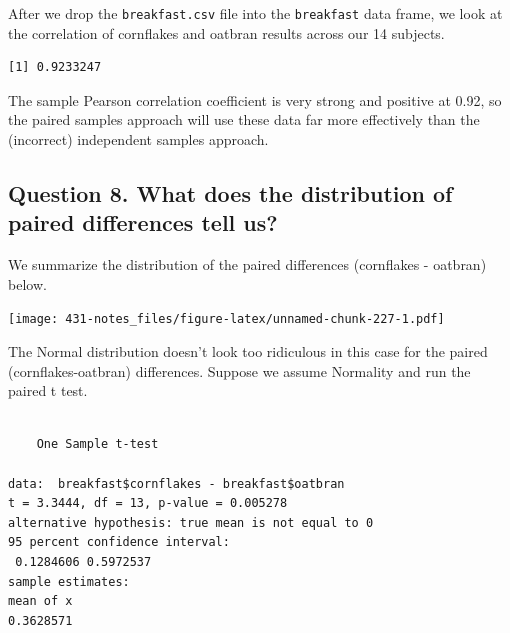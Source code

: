 \documentclass[
]{book}
\newenvironment{Shaded}{\begin{snugshade}}{\end{snugshade}}
\newcommand{\KeywordTok}[1]{\textcolor[rgb]{0.13,0.29,0.53}{\textbf{#1}}}
\newcommand{\NormalTok}[1]{#1}
\newcommand{\OperatorTok}[1]{\textcolor[rgb]{0.81,0.36,0.00}{\textbf{#1}}}
\newcommand{\StringTok}[1]{\textcolor[rgb]{0.31,0.60,0.02}{#1}}
\begin{document}
After we drop the \texttt{breakfast.csv} file into the \texttt{breakfast} data frame, we look at the correlation of cornflakes and oatbran results across our 14 subjects.

\begin{Shaded}
\end{Shaded}

\begin{verbatim}
[1] 0.9233247
\end{verbatim}

The sample Pearson correlation coefficient is very strong and positive at 0.92, so the paired samples approach will use these data far more effectively than the (incorrect) independent samples approach.

\hypertarget{question-8.-what-does-the-distribution-of-paired-differences-tell-us}{%
\subsection{Question 8. What does the distribution of paired differences tell us?}\label{question-8.-what-does-the-distribution-of-paired-differences-tell-us}}

We summarize the distribution of the paired differences (cornflakes - oatbran) below.

\texttt{[image: 431-notes\_files/figure-latex/unnamed-chunk-227-1.pdf]}

The Normal distribution doesn't look too ridiculous in this case for the paired (cornflakes-oatbran) differences. Suppose we assume Normality and run the paired t test.

\begin{Shaded}
\end{Shaded}

\begin{verbatim}

	One Sample t-test

data:  breakfast$cornflakes - breakfast$oatbran
t = 3.3444, df = 13, p-value = 0.005278
alternative hypothesis: true mean is not equal to 0
95 percent confidence interval:
 0.1284606 0.5972537
sample estimates:
mean of x 
0.3628571 
\end{verbatim}
\end{document}
